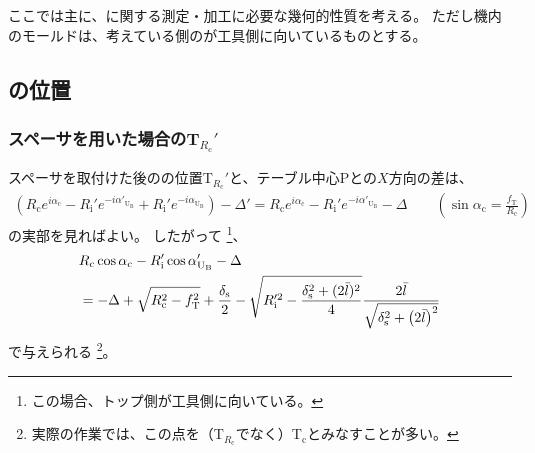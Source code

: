 

ここでは主に、\textbf{\EndFacecut}に関する測定・加工に必要な幾何的性質を考える。
ただし機内のモールドは、考えている側の\EndFace が工具側に向いているものとする。





\subsection{\TopCurvatureCenter の位置}

\subsubsection{スペーサを用いた場合のT\texorpdfstring{$_{R_\mathrm c}'$}{Rc'}}
スペーサを取付けた後の\TopCurvatureCenter の位置T$_{R_\mathrm c}'$と、テーブル中心Pとの$X$方向の差は、
\begin{align*}
  \left(
    R_\mathrm ce^{i\alpha_\mathrm c}
    -R_\mathrm i'e^{-i\alpha'_{\mathrm U_\mathrm B}}
    +R_\mathrm i'e^{-i\alpha_{\mathrm U_\mathrm B}}
  \right)
  -\Delta'
  = R_\mathrm ce^{i\alpha_\mathrm c}-R_\mathrm i'e^{-i\alpha'_{\mathrm U_\mathrm B}}-\Delta \qquad
    \left(\sin\alpha_\mathrm c = \frac{f_\mathrm T}{R_\mathrm c}\right)
\end{align*}
の実部を見ればよい。
したがって
\footnote{この場合、トップ側が工具側に向いている。}、
\begin{align}
  \notag
  &  R_\mathrm c\cos\alpha_\mathrm c-R_\mathrm i'\cos\alpha'_{\mathrm U_\mathrm B}-\Delta\\
  &= -\Delta+\sqrt{R_\mathrm c^2-f_\mathrm T^2}+\frac{\delta_\mathrm s}2
     -\sqrt{R_\mathrm i'^2-\frac{\delta_\mathrm s^2+(2\bar l)^2}4}
      \frac{2\bar l}{\sqrt{\delta_\mathrm s^2+\left(2\bar l\right)^2}}
     \label{eq:spacerTRc}
\end{align}
で与えられる
\footnote{実際の作業では、この点を（\TopCurvatureCenter T$_{R_\mathrm c}\!$でなく）\OutcutCenter T$_\mathrm c$とみなすことが多い。}。


